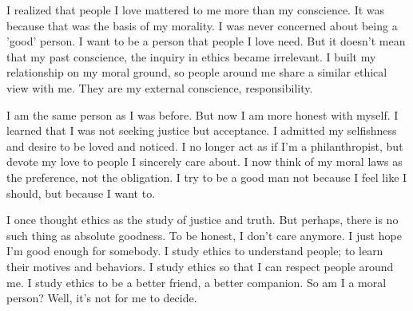 \documentclass[10pt,a4paper]{article}
\begin{document}
	I realized that people I love mattered to me more than my conscience. It was because that was the basis of my morality. I was never concerned about being a 'good' person. I want to be a person that people I love need. But it doesn't mean that my past conscience, the inquiry in ethics became irrelevant. I built my relationship on my moral ground, so people around me share a similar ethical view with me. They are my external conscience, responsibility.
	
	I am the same person as I was before. But now I am more honest with myself. I learned that I was not seeking justice but acceptance.  I admitted my selfishness and desire to be loved and noticed. I no longer act as if I’m a philanthropist, but devote my love to people I sincerely care about. I now think of my moral laws as the preference, not the obligation. I try to be a good man not because I feel like I should, but because I want to.
	
	I once thought ethics as the study of justice and truth. But perhaps, there is no such thing as absolute goodness. To be honest, I don't care anymore. I just hope I'm good enough for somebody. I study ethics to understand people; to learn their motives and behaviors. I study ethics so that I can respect people around me.  I study ethics to be a better friend, a better companion. So am I a moral person? Well, it's not for me to decide.
		
\end{document}
